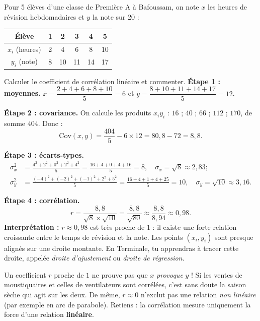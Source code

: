 \documentclass[11pt]{article}
\begin{document}
\begin{exoresolu}
Pour 5 élèves d'une classe de Première A à Bafoussam, on note $x$ les heures de révision hebdomadaires et $y$ la note sur 20 :
\begin{center}
\begin{tabular}{|c|ccccc|}\hline
\rowcolor{popblueL} Élève & 1 & 2 & 3 & 4 & 5 \\ \hline
$x_i$ (heures) & 2 & 4 & 6 & 8 & 10 \\ \hline
$y_i$ (note) & 8 & 10 & 11 & 14 & 17 \\ \hline
\end{tabular}
\end{center}
Calculer le coefficient de corrélation linéaire et commenter.
\tcblower
\textbf{Étape 1 : moyennes.} $\bar{x} = \dfrac{2+4+6+8+10}{5} = 6$ et $\bar{y} = \dfrac{8+10+11+14+17}{5} = 12$.

\textbf{Étape 2 : covariance.} On calcule les produits $x_i y_i$ : $16$ ; $40$ ; $66$ ; $112$ ; $170$, de somme $404$. Donc :
\[
\mathrm{Cov}(x,y) = \frac{404}{5} - 6 \times 12 = 80,8 - 72 = 8,8.
\]

\textbf{Étape 3 : écarts-types.}
\begin{align*}
\sigma_x^2 &= \frac{4^2 + 2^2 + 0^2 + 2^2 + 4^2}{5} = \frac{16+4+0+4+16}{5} = 8, \quad \sigma_x = \sqrt{8} \approx 2,83 ;\\
\sigma_y^2 &= \frac{(-4)^2 + (-2)^2 + (-1)^2 + 2^2 + 5^2}{5} = \frac{16+4+1+4+25}{5} = 10, \quad \sigma_y = \sqrt{10} \approx 3,16.
\end{align*}

\textbf{Étape 4 : corrélation.}
\[
r = \frac{8,8}{\sqrt{8}\times\sqrt{10}} = \frac{8,8}{\sqrt{80}} \approx \frac{8,8}{8,94} \approx 0,98.
\]
\textbf{Interprétation :} $r \approx 0,98$ est très proche de $1$ : il existe une forte relation croissante entre le temps de révision et la note. Les points $(x_i, y_i)$ sont presque alignés sur une droite montante. En Terminale, tu apprendras à tracer cette droite, appelée \emph{droite d'ajustement} ou \emph{droite de régression}.
\end{exoresolu}

\begin{attention}
Un coefficient $r$ proche de $1$ ne prouve pas que $x$ \emph{provoque} $y$ ! Si les ventes de moustiquaires et celles de ventilateurs sont corrélées, c'est sans doute la saison sèche qui agit sur les deux. De même, $r \approx 0$ n'exclut pas une relation \emph{non linéaire} (par exemple en arc de parabole). Retiens : la corrélation mesure uniquement la force d'une relation \textbf{linéaire}.
\end{attention}
\end{document}
